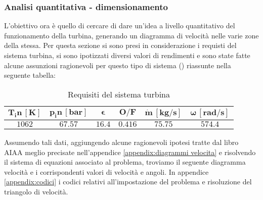 \subsubsection{Analisi quantitativa - dimensionamento}

L'obiettivo ora è quello di cercare di dare un'idea a livello quantitativo del funzionamento della turbina, generando un diagramma di velocità nelle varie zone della stessa. 
Per questa sezione si sono presi in considerazione i requisti del sistema turbina, si sono ipotizzati diversi valori di rendimenti e sono state fatte alcune assunzioni ragionevoli per questo tipo di sistema (\cite{AIAA_book_2}) riassunte nella seguente tabella: 
\begin{table}[H]

\centering
\begin{tabular}{|c|c|c|c|c|c|}
\hline
$\bm{T_in \, [K]}$ & $\bm{p_in \, [bar]}$ & $\bm{\epsilon}$ &  $\bm{O/F}$ & $\bm{\dot{m} \, [kg/s]}$ & $\bm{\omega \, [rad/s]}$  \\
\hline
$1062$ & $67.57$ & $16.4$ &  $0.416$ & $75.75$ & $574.4$ \\
\hline
\end{tabular}

\caption{Requisiti del sistema turbina}
\label{table:turbine specs}

\end{table}

Assumendo tali dati, aggiungendo alcune ragionevoli ipotesi tratte dal libro AIAA meglio precisate nell'appendice \autoref{appendix:diagrammi velocita} e risolvendo il sistema di equazioni associato al problema, troviamo il seguente diagramma velocità e i corrispondenti valori di velocità e angoli. In appendice \autoref{appendix:codici} i codici relativi all'impostazione del problema e risoluzione del triangolo di velocità.
